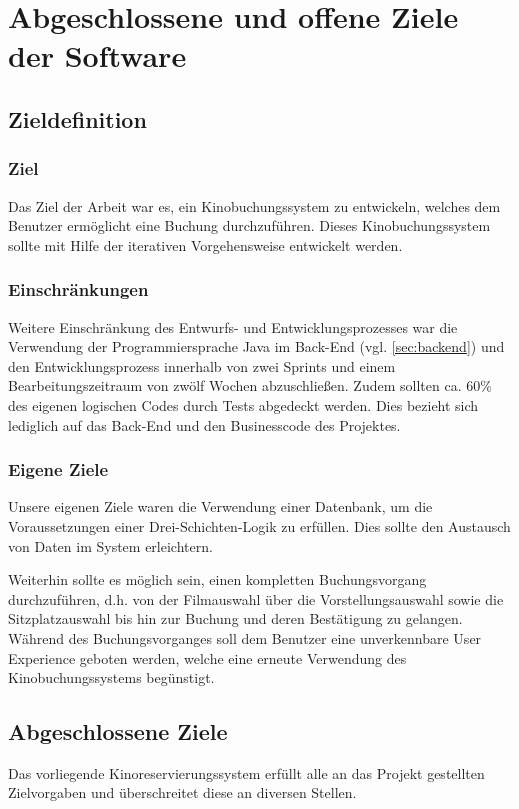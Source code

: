 \section{Abgeschlossene und offene Ziele der Software}
\multipleauthorsection{\authorRF}{\authorEJ}
\label{sec:ziele}
\subsection{Zieldefinition}
\subsubsection*{Ziel}
Das Ziel der Arbeit war es, ein Kinobuchungssystem zu entwickeln, welches dem Benutzer ermöglicht eine Buchung durchzuführen.
Dieses Kinobuchungssystem sollte mit Hilfe der iterativen Vorgehensweise entwickelt werden.
\subsubsection*{Einschränkungen}
Weitere Einschränkung des Entwurfs- und Entwicklungsprozesses war die Verwendung der Programmiersprache Java im Back-End (vgl. \vref{sec:backend}) und den Entwicklungsprozess innerhalb von zwei Sprints und einem Bearbeitungszeitraum von zwölf Wochen abzuschließen.
Zudem sollten ca. 60\% des eigenen logischen Codes durch Tests abgedeckt werden.
Dies bezieht sich lediglich auf das Back-End und den Businesscode des Projektes.

\subsubsection*{Eigene Ziele}
Unsere eigenen Ziele waren die Verwendung einer Datenbank, um die Voraussetzungen einer Drei-Schichten-Logik zu erfüllen.
Dies sollte den Austausch von Daten im System erleichtern.

Weiterhin sollte es möglich sein, einen kompletten Buchungsvorgang durchzuführen, d.h. von der Filmauswahl über die Vorstellungsauswahl sowie die Sitzplatzauswahl bis hin zur Buchung und deren Bestätigung zu gelangen.
Während des Buchungsvorganges soll dem Benutzer eine unverkennbare User Experience geboten werden, welche eine erneute Verwendung des Kinobuchungssystems begünstigt.

\subsection{Abgeschlossene Ziele}
\label{ssec:abgeschlossene_ziele}
Das vorliegende Kinoreservierungssystem erfüllt alle an das Projekt gestellten Zielvorgaben und überschreitet diese an diversen Stellen.

